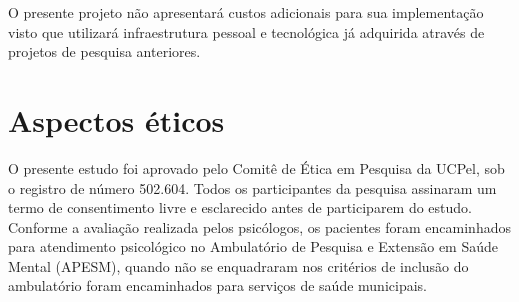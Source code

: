 \documentclass[chapter=TITLE,
               oneside,
               12pt,
               a4paper,
               english,
               brazil]{abntex2}    %
\begin{document}
    O presente projeto não apresentará custos adicionais para sua implementação
    visto que utilizará infraestrutura pessoal e tecnológica já adquirida através
    de projetos de pesquisa anteriores.

\section{Aspectos éticos}\label{sec:aspectoseticos}

    O presente estudo foi aprovado pelo Comitê de Ética em Pesquisa da UCPel,
    sob o registro de número 502.604. Todos os participantes da pesquisa assinaram
    um termo de consentimento livre e esclarecido antes de participarem do estudo.
    Conforme a avaliação realizada pelos psicólogos, os pacientes foram encaminhados
    para atendimento psicológico no Ambulatório de Pesquisa e Extensão em Saúde Mental
    (APESM), quando não se enquadraram nos critérios de inclusão do ambulatório foram
    encaminhados para serviços de saúde municipais.

\endgroup

\postextual

\printbibliography

\apendices
\end{document}
